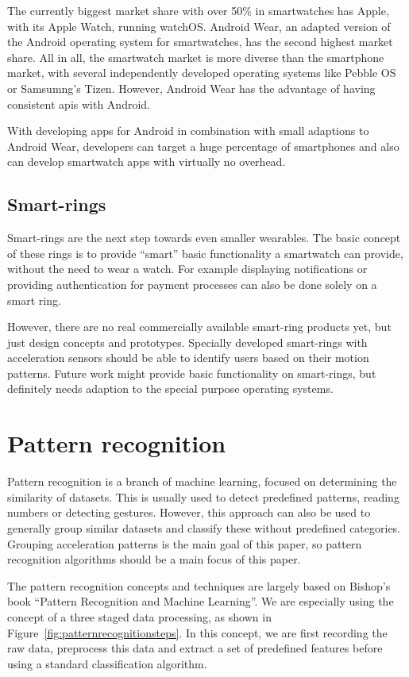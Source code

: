 The currently biggest market share with over 50\% in smartwatches has Apple, with its Apple Watch, running watchOS. Android Wear, an adapted version of the Android operating system for smartwatches, has the second highest market share. All in all, the smartwatch market is more diverse than the smartphone market, with several independently developed operating systems like Pebble OS or Samsumng's Tizen. However, Android Wear has the advantage of having consistent \Glspl{api} with Android. 

With developing \glspl{app} for Android in combination with small adaptions to Android Wear, developers can target a huge percentage of smartphones and also can develop smartwatch apps with virtually no overhead.

\subsection{Smart-rings}
Smart-rings are the next step towards even smaller wearables. The basic concept of these rings is to provide ``smart'' basic functionality a smartwatch can provide, without the need to wear a watch. For example displaying notifications or providing authentication for payment processes can also be done solely on a smart ring.

However, there are no real commercially available smart-ring products yet, but just design concepts and prototypes. Specially developed smart-rings with acceleration sensors should be able to identify users based on their motion patterns. Future work might provide basic functionality on smart-rings, but definitely needs adaption to the special purpose operating systems. 

\section{Pattern recognition}
Pattern recognition is a branch of machine learning, focused on determining the similarity of datasets. This is usually used to detect predefined patterns, \eg reading numbers or detecting gestures. However, this approach can also be used to generally group similar datasets and classify these without predefined categories. Grouping acceleration patterns is the main goal of this paper, so pattern recognition algorithms should be a main focus of this paper.

The pattern recognition concepts and techniques are largely based on Bishop's book ``Pattern Recognition and Machine Learning''\cite{bishop2006pattern}. We are especially using the concept of a three staged data processing, as shown in Figure~\ref{fig:patternrecognitionsteps}. In this concept, we are first recording the raw data, preprocess this data and extract a set of predefined features before using a standard classification algorithm.

